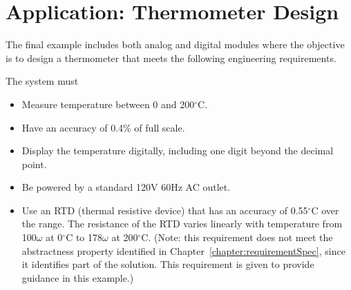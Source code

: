 \section{Application: Thermometer Design}
\label{section:application-thermometer-design}

The final example includes both analog and digital modules where the
objective is to design a thermometer that meets the following
engineering requirements.

The system must

\begin{itemize}
\item  Measure temperature between 0 and 200$^\circ$C.
\item  Have an accuracy of 0.4\% of full scale.
\item  Display the temperature digitally, including one digit beyond the
  decimal point.
\item  Be powered by a standard 120V 60Hz AC outlet.
\item  Use an RTD (thermal resistive device) that has an accuracy of 0.55$^\circ$C
  over the range. The resistance of the RTD varies linearly with
  temperature from 100$\omega$ at 0$^\circ$C to 178$\omega$ at 200$^\circ$C. (Note: this requirement
  does not meet the abstractness property identified in 
  Chapter~\ref{chapter:requirementSpec}, since
  it identifies part of the solution. This requirement is given to
  provide guidance in this example.)
\end{itemize}



